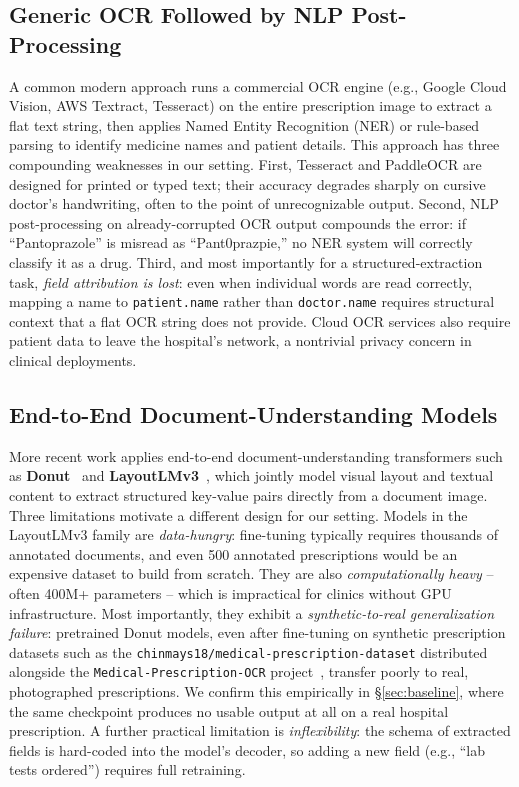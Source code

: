 \documentclass[conference]{IEEEtran}
\begin{document}
\subsection{Generic OCR Followed by NLP Post-Processing}
\label{sec:generic-ocr}

A common modern approach runs a commercial OCR engine (e.g., Google Cloud Vision, AWS Textract, Tesseract) on the entire prescription image to extract a flat text string, then applies Named Entity Recognition (NER) or rule-based parsing to identify medicine names and patient details. This approach has three compounding weaknesses in our setting. First, Tesseract and PaddleOCR are designed for printed or typed text; their accuracy degrades sharply on cursive doctor's handwriting, often to the point of unrecognizable output. Second, NLP post-processing on already-corrupted OCR output compounds the error: if ``Pantoprazole'' is misread as ``Pant0prazpie,'' no NER system will correctly classify it as a drug. Third, and most importantly for a structured-extraction task, \emph{field attribution is lost}: even when individual words are read correctly, mapping a name to \texttt{patient.name} rather than \texttt{doctor.name} requires structural context that a flat OCR string does not provide. Cloud OCR services also require patient data to leave the hospital's network, a nontrivial privacy concern in clinical deployments.

\subsection{End-to-End Document-Understanding Models}
\label{sec:related-donut}

More recent work applies end-to-end document-understanding transformers such as \textbf{Donut}~\cite{kim2022donut} and \textbf{LayoutLMv3}~\cite{huang2022layoutlmv3}, which jointly model visual layout and textual content to extract structured key-value pairs directly from a document image. Three limitations motivate a different design for our setting. Models in the LayoutLMv3 family are \emph{data-hungry}: fine-tuning typically requires thousands of annotated documents, and even 500 annotated prescriptions would be an expensive dataset to build from scratch. They are also \emph{computationally heavy} -- often 400M+ parameters -- which is impractical for clinics without GPU infrastructure. Most importantly, they exhibit a \emph{synthetic-to-real generalization failure}: pretrained Donut models, even after fine-tuning on synthetic prescription datasets such as the \texttt{chinmays18/medical-prescription-dataset} distributed alongside the \texttt{Medical-Prescription-OCR} project~\cite{shrivastava2024medocr}, transfer poorly to real, photographed prescriptions. We confirm this empirically in \S\ref{sec:baseline}, where the same checkpoint produces no usable output at all on a real hospital prescription. A further practical limitation is \emph{inflexibility}: the schema of extracted fields is hard-coded into the model's decoder, so adding a new field (e.g., ``lab tests ordered'') requires full retraining.
\end{document}
